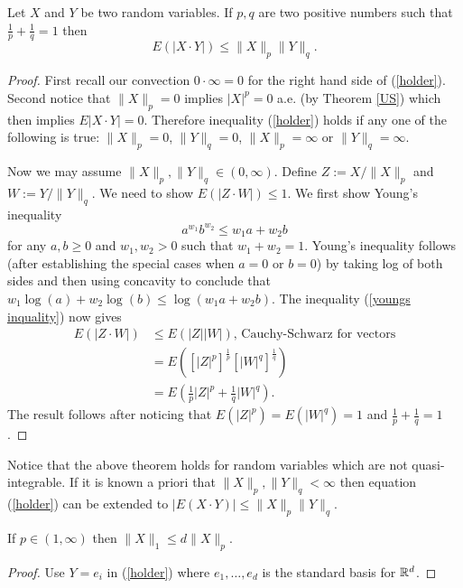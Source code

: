 \begin{theorem}[{\bf H\"older}]
Let $X$ and $Y$ be two random variables. If $p, q$ are two positive numbers such that $\frac{1}{p}+\frac{1}{q}=1$ then
\begin{equation}
\label{holder}
E(|X\cdot Y|)\leq \| X\|_p\|Y\|_q.
\end{equation}
\end{theorem}
\begin{proof}
First recall our convection $0 \cdot \infty = 0$ for the right hand side of (\ref{holder}). Second notice that $\| X\|_p=0$ implies $|X|^p=0$ a.e. (by Theorem \ref{US}) which then implies $E|X\cdot Y|=0$. Therefore inequality (\ref{holder}) holds if any one of the following is true: $ \| X\|_p = 0$, $\| Y\|_q = 0$, $\| X\|_p = \infty$ or $\| Y\|_q = \infty$.

Now we may assume $ \| X\|_p, \|Y \|_q \in (0,\infty)$. Define $Z:= X/\| X\|_p$ and $W := Y/\|Y\|_q$. We need to show $E(|Z\cdot W|)\leq 1$. 
We first show Young's inequality
\begin{equation}
\label{youngs inquality}
a^{w_1}b^{w_2}\leq w_1 a + w_2 b
\end{equation}
for any $a,b\geq 0$ and $w_1, w_2 >0$ such that $w_1 + w_2 = 1$. Young's inequality follows (after establishing the special cases when $a=0$ or $b=0$) by taking log of both sides and then using concavity to conclude that $w_1 \log(a) + w_2\log(b)\leq \log(w_1a+w_2b)$. The inequality (\ref{youngs inquality}) now gives
\begin{align*}
E(|Z\cdot W|)&\leq E(|Z||W|),\,\text{Cauchy-Schwarz for vectors} \\
&=E([|Z|^p]^{\frac{1}{p}}[|W|^q]^{\frac{1}{q}}) \\
&=E(\frac{1}{p}|Z|^p +\frac{1}{q} |W|^q). 
\end{align*}
The result follows after noticing that $E(|Z|^p) = E(|W|^q)=1$ and $\frac{1}{p}+\frac{1}{q}=1$.
\end{proof}

Notice that the above theorem holds for random variables which are not quasi-integrable. If it is known a priori that $\| X\|_p, \|Y\|_q<\infty$ then equation (\ref{holder}) can be extended to $| E(X\cdot Y) |\leq \| X\|_p\|Y\|_q$.


\begin{theorem} If $p\in(1,\infty)$ then  $\|X\|_1 \leq d\|X\|_p$.
\end{theorem}
\begin{proof} Use $Y = e_i$ in (\ref{holder}) where $e_1,\ldots, e_d$ is the standard basis for $\Bbb R^d$.
\end{proof}


